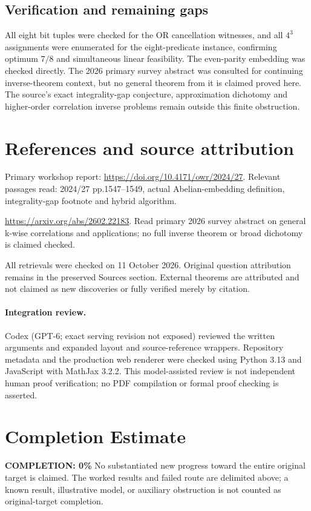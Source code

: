 \documentclass[11pt]{article}
\begin{document}
\subsection{Verification and remaining gaps}
All eight bit tuples were checked for the OR cancellation witnesses, and all $4^3$ assignments were enumerated for the eight-predicate instance, confirming optimum $7/8$ and simultaneous linear feasibility. The even-parity embedding was checked directly. The 2026 primary survey abstract was consulted for continuing inverse-theorem context, but no general theorem from it is claimed proved here. The source's exact integrality-gap conjecture, approximation dichotomy and higher-order correlation inverse problems remain outside this finite obstruction.

\section{References and source attribution}
Primary workshop report: \url{https://doi.org/10.4171/owr/2024/27}. Relevant passages read: 2024/27 pp.1547--1549, actual Abelian-embedding definition, integrality-gap footnote and hybrid algorithm.

\url{https://arxiv.org/abs/2602.22183}. Read primary 2026 survey abstract on general k-wise correlations and applications; no full inverse theorem or broad dichotomy is claimed checked.

All retrievals were checked on 11 October 2026. Original question attribution remains in the preserved Sources section. External theorems are attributed and not claimed as new discoveries or fully verified merely by citation.


\paragraph{Integration review.} Codex (GPT-6; exact serving revision not exposed) reviewed the written arguments and expanded layout and source-reference wrappers. Repository metadata and the production web renderer were checked using Python 3.13 and JavaScript with MathJax 3.2.2. This model-assisted review is not independent human proof verification; no PDF compilation or formal proof checking is asserted.

\section{Completion Estimate}
\noindent\textbf{COMPLETION: 0\%}
No substantiated new progress toward the entire original target is claimed. The worked results and failed route are delimited above; a known result, illustrative model, or auxiliary obstruction is not counted as original-target completion.
\end{document}

